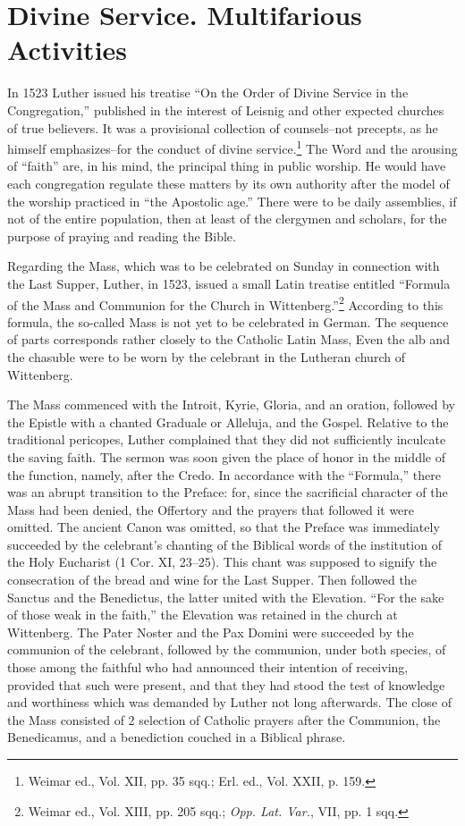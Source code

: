 \section{Divine Service. Multifarious Activities}

In 1523 Luther issued his treatise “On the Order of Divine Service
in the Congregation,” published in the interest of Leisnig and other
expected churches of true believers. It was a provisional collection
of counsels--not precepts, as he himself emphasizes--for the conduct of
divine service.\footnote{Weimar ed., Vol. XII, pp. 35 sqq.; Erl. ed., Vol. XXII, p. 159.}
The Word and the arousing of “faith” are,
in his mind, the principal thing in public worship. He would have
each congregation regulate these matters by its own authority after
the model of the worship practiced in “the Apostolic age.” There
were to be daily assemblies, if not of the entire population, then at
least of the clergymen and scholars, for the purpose of praying and
reading the Bible.

Regarding the Mass, which was to be celebrated on Sunday in
connection with the Last Supper, Luther, in 1523, issued a small
Latin treatise entitled “Formula of the Mass and Communion for
the Church in Wittenberg.”\footnote{Weimar ed., Vol. XIII, pp. 205 sqq.; \textit{Opp. Lat. Var.}, VII, pp. 1 sqq.}
According to this formula, the so-called
Mass is not yet to be celebrated in German. The sequence
of parts corresponds rather closely to the Catholic Latin Mass, Even
the alb and the chasuble were to be worn by the celebrant in the
Lutheran church of Wittenberg.

The Mass commenced with the Introit, Kyrie, Gloria, and an oration,
followed by the Epistle with a chanted Graduale or Alleluja, and the Gospel.
Relative to the traditional pericopes, Luther complained that they did not
sufficiently inculcate the saving faith. The sermon was soon given the place
of honor in the middle of the function, namely, after the Credo. In accordance
with the “Formula,” there was an abrupt transition to the Preface: for,
since the sacrificial character of the Mass had been denied, the Offertory and
the prayers that followed it were omitted. The ancient Canon was omitted,
so that the Preface was immediately succeeded by the celebrant’s chanting
of the Biblical words of the institution of the Holy Eucharist (1 Cor. XI,
23--25). This chant was supposed to signify the consecration of the bread
and wine for the Last Supper. Then followed the Sanctus and the Benedictus,
the latter united with the Elevation. “For the sake of those weak in the
faith,” the Elevation was retained in the church at Wittenberg. The Pater
Noster and the Pax Domini were succeeded by the communion of the celebrant,
followed by the communion, under both species, of those among the
faithful who had announced their intention of receiving, provided that such
were present, and that they had stood the test of knowledge and worthiness
which was demanded by Luther not long afterwards. The close of the Mass
consisted of 2 selection of Catholic prayers after the Communion, the
Benedicamus, and a benediction couched in a Biblical phrase.

